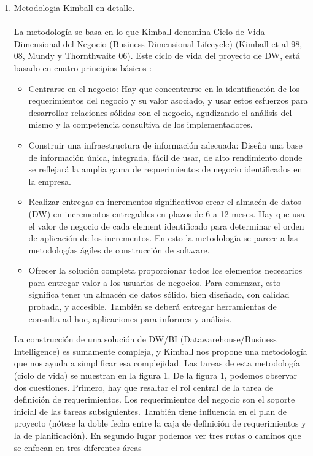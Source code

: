 \documentclass[preprint,12pt]{elsarticle}
\begin{document}
\begin{enumerate}[3.1]
    \item Metodologia Kimball en detalle.\\
\\

La metodología se basa en lo que Kimball denomina Ciclo de Vida Dimensional del Negocio (Business Dimensional Lifecycle) (Kimball et al 98, 08, Mundy y Thornthwaite 06). Este ciclo de vida del proyecto de DW, está basado en cuatro principios básicos :
\begin{itemize}
  \item Centrarse en el negocio:  Hay que concentrarse en la identificación de los requerimientos del negocio y su valor asociado, y usar estos esfuerzos para desarrollar relaciones sólidas con el negocio, agudizando el análisis del mismo y la competencia consultiva de los implementadores.
\\
  \item Construir una infraestructura de informaci\'on adecuada: Diseña una base de información única, integrada, fácil de usar, de alto rendimiento donde se reflejará la amplia gama de requerimientos de negocio identificados en la empresa.\\
  \item Realizar entregas en incrementos significativos crear el almacén de datos (DW) en incrementos entregables en plazos de 6 a 12 meses. Hay que usa el valor de negocio de cada element identificado para determinar el orden de aplicación de los incrementos. En esto la metodología se parece a las metodologías ágiles de construcción de software.\\
  \item 
Ofrecer la solución completa proporcionar todos los elementos necesarios para entregar valor a los usuarios de negocios. Para comenzar, esto significa tener un almacén de datos sólido, bien diseñado, con calidad probada, y accesible. También se deberá entregar herramientas de consulta ad hoc, aplicaciones para informes y análisis. \\
\end{itemize} 

La construcción de una solución de DW/BI (Datawarehouse/Business Intelligence) es sumamente compleja, y Kimball nos propone una metodología que nos ayuda a simplificar esa complejidad. Las tareas de esta metodología (ciclo de vida) se muestran en la figura 1. 
De la figura 1, podemos observar dos cuestiones. Primero, hay que resaltar el rol central de la tarea de definición de requerimientos. Los requerimientos del negocio son el soporte inicial de las tareas subsiguientes. También tiene influencia en el plan de proyecto (nótese la doble fecha entre la caja de definición de requerimientos y la de planificación). En segundo lugar podemos ver tres rutas o caminos que se enfocan en tres diferentes áreas


\end{enumerate}
\end{document}
